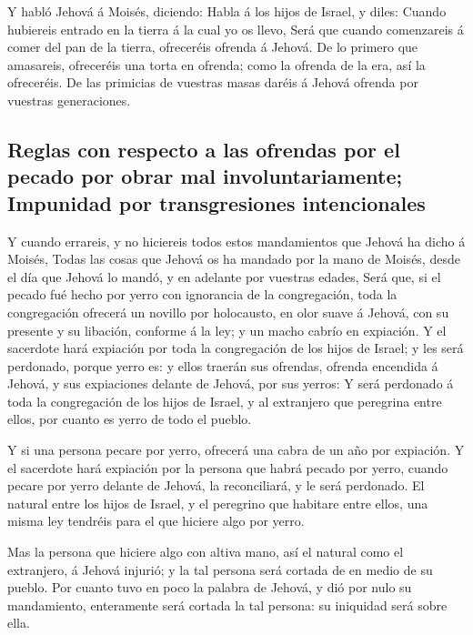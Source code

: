  Y habló Jehová á Moisés, diciendo:  Habla á
los hijos de Israel, y diles: Cuando hubiereis entrado en la tierra á la
cual yo os llevo,  Será que cuando comenzareis á comer del
pan de la tierra, ofreceréis ofrenda á Jehová.  De lo
primero que amasareis, ofreceréis una torta en ofrenda; como la ofrenda
de la era, así la ofreceréis.  De las primicias de vuestras
masas daréis á Jehová ofrenda por vuestras generaciones.

\hypertarget{reglas-con-respecto-a-las-ofrendas-por-el-pecado-por-obrar-mal-involuntariamente-impunidad-por-transgresiones-intencionales}{%
\subsection{Reglas con respecto a las ofrendas por el pecado por obrar
mal involuntariamente; Impunidad por transgresiones
intencionales}\label{reglas-con-respecto-a-las-ofrendas-por-el-pecado-por-obrar-mal-involuntariamente-impunidad-por-transgresiones-intencionales}}

 Y cuando errareis, y no hiciereis todos estos mandamientos
que Jehová ha dicho á Moisés,  Todas las cosas que Jehová
os ha mandado por la mano de Moisés, desde el día que Jehová lo mandó, y
en adelante por vuestras edades,  Será que, si el pecado
fué hecho por yerro con ignorancia de la congregación, toda la
congregación ofrecerá un novillo por holocausto, en olor suave á Jehová,
con su presente y su libación, conforme á la ley; y un macho cabrío en
expiación.  Y el sacerdote hará expiación por toda la
congregación de los hijos de Israel; y les será perdonado, porque yerro
es: y ellos traerán sus ofrendas, ofrenda encendida á Jehová, y sus
expiaciones delante de Jehová, por sus yerros:  Y será
perdonado á toda la congregación de los hijos de Israel, y al extranjero
que peregrina entre ellos, por cuanto es yerro de todo el pueblo.

 Y si una persona pecare por yerro, ofrecerá una cabra de
un año por expiación.  Y el sacerdote hará expiación por la
persona que habrá pecado por yerro, cuando pecare por yerro delante de
Jehová, la reconciliará, y le será perdonado.  El natural
entre los hijos de Israel, y el peregrino que habitare entre ellos, una
misma ley tendréis para el que hiciere algo por yerro.

 Mas la persona que hiciere algo con altiva mano, así el
natural como el extranjero, á Jehová injurió; y la tal persona será
cortada de en medio de su pueblo.  Por cuanto tuvo en poco
la palabra de Jehová, y dió por nulo su mandamiento, enteramente será
cortada la tal persona: su iniquidad será sobre ella.

